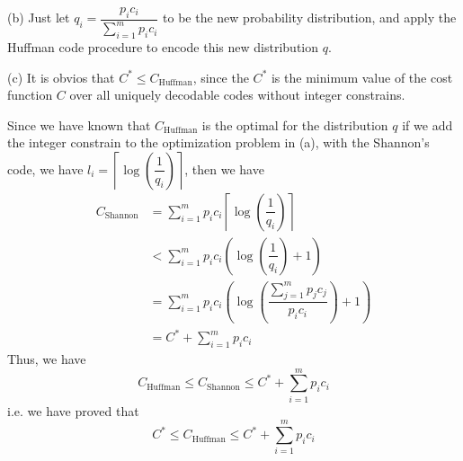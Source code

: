 (b) Just let $q_i=\dfrac{p_ic_i}{\sum\limits_{i=1}^mp_ic_i}$ to be the new probability distribution, and apply the Huffman code procedure to encode this new distribution $q$.

(c) It is obvios that $C^*\leq C_\text{Huffman}$, since the $C^*$ is the minimum value of the cost function $C$ over all uniquely decodable codes without integer constrains.

Since we have known that $C_\text{Huffman}$ is the optimal for the distribution $q$ if we add the integer constrain to the optimization problem in (a), with the Shannon's code, we have $l_i=\left\lceil\log\left(\dfrac{1}{q_i}\right)\right\rceil$, then we have
\begin{align*}
C_\text{Shannon} &= \sum_{i=1}^mp_ic_i\left\lceil\log\left(\dfrac{1}{q_i}\right)\right\rceil \\
&< \sum_{i=1}^mp_ic_i\left(\log\left(\dfrac{1}{q_i}\right)+1\right) \\
&= \sum_{i=1}^mp_ic_i\left(\log\left(\dfrac{\sum\limits_{j=1}^mp_jc_j}{p_ic_i}\right)+1\right) \\
&= C^* + \sum_{i=1}^mp_ic_i
\end{align*}
Thus, we have
$$C_\text{Huffman}\leq C_\text{Shannon}\leq C^*+\sum\limits_{i=1}^mp_ic_i$$
i.e. we have proved that
$$C^*\leq C_\text{Huffman}\leq C^*+\sum_{i=1}^mp_ic_i$$

\newpage